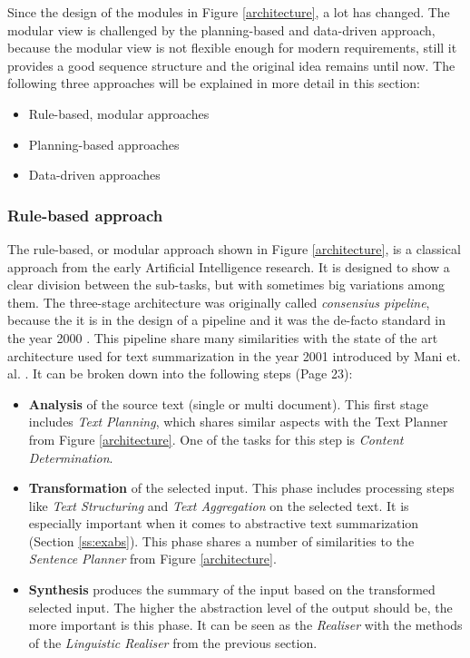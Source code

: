 Since the design of the modules in Figure \ref{architecture}, a lot has changed. The modular view is challenged by the planning-based and data-driven approach, because the modular view is not flexible enough for modern requirements, still it provides a good sequence structure and the original idea remains until now. The following three approaches will be explained in more detail in this section:

\begin{itemize}
	\item Rule-based, modular approaches
	\item Planning-based approaches
	\item Data-driven approaches
\end{itemize}

\subsubsection{Rule-based approach}\label{ss:rule}

The rule-based, or modular approach shown in Figure \ref{architecture}, is a classical approach from the early Artificial Intelligence research. It is designed to show a clear division between the sub-tasks, but with sometimes big variations among them. The three-stage architecture was originally called \textit{consensius pipeline}, because the it is in the design of a pipeline and it was the de-facto standard in the year 2000 \cite{reiter2}. This pipeline share many similarities with the state of the art architecture used for text summarization in the year 2001 introduced by Mani et. al. \cite{mani}. It can be broken down into the following steps \cite{gatt} (Page 23):

\begin{itemize}
	\item \textbf{Analysis} of the source text (single or multi document). This first stage includes \textit{Text Planning}, which shares similar aspects with the Text Planner from Figure \ref{architecture}. One of the tasks for this step is \textit{Content Determination}.
	\item \textbf{Transformation} of the selected input. This phase includes processing steps like \textit{Text Structuring} and \textit{Text Aggregation} on the selected text. It is especially important when it comes to abstractive text summarization (Section \ref{ss:exabs}). This phase shares a number of similarities to the \textit{Sentence Planner} from Figure \ref{architecture}.
	\item \textbf{Synthesis} produces the summary of the input based on the transformed selected input. The higher the abstraction level of the output should be, the more important is this phase. It can be seen as the \textit{Realiser} with the methods of the \textit{Linguistic Realiser} from the previous section.
\end{itemize}

